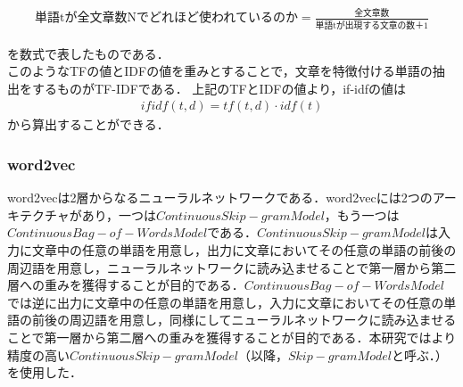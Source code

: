 \begin{align}
\mbox{単語tが全文章数Nでどれほど使われているのか} = \frac{\mbox{全文章数}}{\mbox{単語tが出現する文章の数}＋1} \nonumber
\end{align}

を数式で表したものである．\\
このようなTFの値とIDFの値を重みとすることで，文章を特徴付ける単語の抽出をするものがTF-IDFである．
上記のTFとIDFの値より，if-idfの値は
\begin{align}
ifidf(t,d) = tf(t,d) \cdot idf(t) \nonumber
\end{align}
から算出することができる．

\subsubsection{word2vec}
\label{tech:word2vec}
word2vecは2層からなるニューラルネットワークである．word2vecには2つのアーキテクチャがあり，一つは$ Continuous Skip-gram Model $，もう一つは$ Continuous Bag-of-Words Model $である．$ Continuous Skip-gram Model $は入力に文章中の任意の単語を用意し，出力に文章においてその任意の単語の前後の周辺語を用意し，ニューラルネットワークに読み込ませることで第一層から第二層への重みを獲得することが目的である．$ Continuous Bag-of-Words Model $では逆に出力に文章中の任意の単語を用意し，入力に文章においてその任意の単語の前後の周辺語を用意し，同様にしてニューラルネットワークに読み込ませることで第一層から第二層への重みを獲得することが目的である．本研究ではより精度の高い$ Continuous Skip-gram Model $（以降，$ Skip-gram Model $と呼ぶ．）を使用した．\cite{word2vecpaper}

